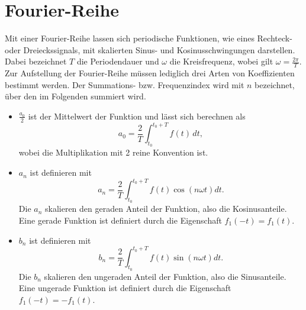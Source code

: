 %
%
%
%

\section{Fourier-Reihe\label{fourier:section:GrundlagenFourierAnalyse}}


Mit einer Fourier-Reihe lassen sich periodische Funktionen, wie eines Rechteck- oder Dreieckssignals, mit skalierten Sinus- und Kosinusschwingungen darstellen.  
Dabei bezeichnet $T$ die Periodendauer und $\omega$ die Kreisfrequenz, wobei gilt $\omega = \frac{2\pi}{T}$.
Zur Aufstellung der Fourier-Reihe müssen lediglich drei Arten von Koeffizienten bestimmt werden. 
Der Summations- bzw. Frequenzindex wird mit $n$ bezeichnet, über den im Folgenden summiert wird.




\begin{itemize}
	
	\item $\frac{a_0}{2}$ ist der Mittelwert der Funktion und lässt sich berechnen als
	\begin{equation}
		a_0 = \frac{2}{T} \int_{t_0}^{t_0 + T} f(t) \, dt,
	\end{equation}
	wobei die Multiplikation mit 2 reine Konvention ist.
	
	\item $a_n$ ist definieren mit 
	\begin{equation}
		a_n = \frac{2}{T} \int_{t_0}^{t_0 + T} f(t) \cos\left(n\omega t\right) dt.
	\end{equation}
	Die $a_n$ skalieren den geraden Anteil der Funktion, also die Kosinusanteile. 
	Eine gerade Funktion ist definiert durch die Eigenschaft $f_1(-t) = f_1(t)$. 
	
	
	\item $b_n$ ist definieren mit 
	\begin{equation}
		b_n = \frac{2}{T} \int_{t_0}^{t_0 + T} f(t) \sin\left(n\omega t\right) dt.
	\end{equation}
	Die $b_n$ skalieren den ungeraden Anteil der Funktion, also die Sinusanteile. 
	Eine ungerade Funktion ist definiert durch die Eigenschaft $f_1(-t) = -f_1(t)$. 
	
\end{itemize}


